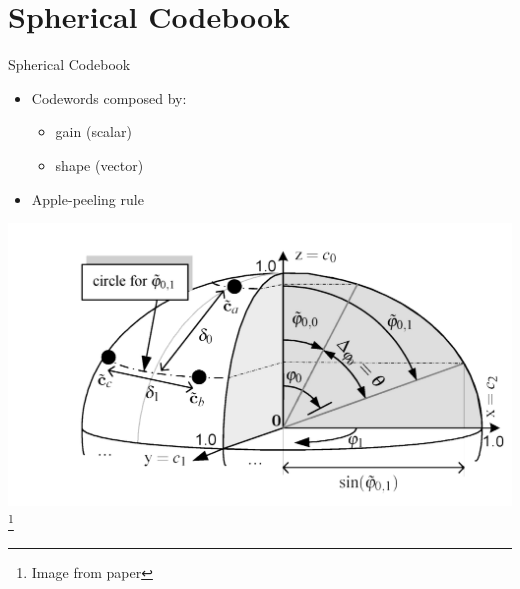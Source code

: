 \documentclass[10pt]{beamer}
\begin{document}
\section{Spherical Codebook}
\endgroup

\begin{frame}{Spherical Codebook}
  \begin{itemize}
    \item Codewords composed by:
    \begin{itemize}
      \item gain (scalar)
      \item shape (vector)
    \end{itemize}
    \item Apple-peeling rule
    \end{itemize}
  \includegraphics[width=0.9\linewidth]{./img/Centroides.png}
  \footnotemark
  \footnote{Image from paper}
\end{frame}
\end{document}
